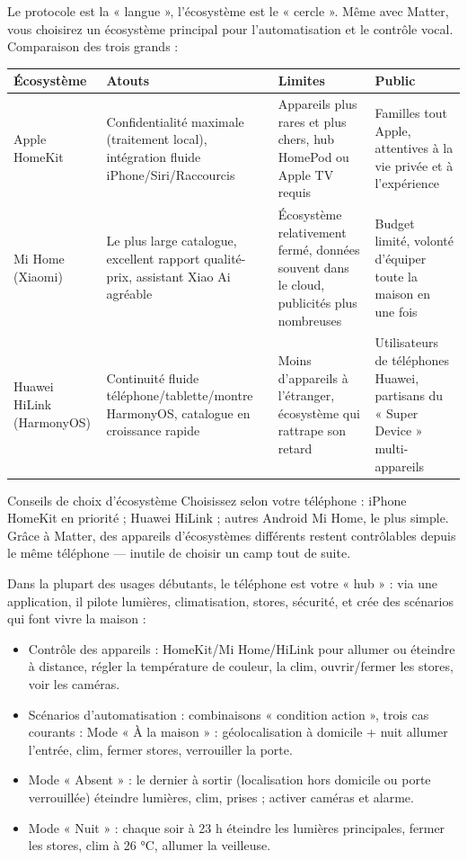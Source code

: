 
Le protocole est la « langue », l'écosystème est le « cercle ». Même avec Matter, vous choisirez un écosystème principal pour l'automatisation et le contrôle vocal. Comparaison des trois grands :

\begin{center}
\begin{tabularx}{\linewidth}{|X|X|X|X|}
\hline
\textbf{Écosystème} & \textbf{Atouts} & \textbf{Limites} & \textbf{Public} \tabularnewline
\hline
Apple HomeKit & Confidentialité maximale (traitement local), intégration fluide iPhone/Siri/Raccourcis & Appareils plus rares et plus chers, hub HomePod ou Apple TV requis & Familles tout Apple, attentives à la vie privée et à l'expérience \tabularnewline
Mi Home (Xiaomi) & Le plus large catalogue, excellent rapport qualité-prix, assistant Xiao Ai agréable & Écosystème relativement fermé, données souvent dans le cloud, publicités plus nombreuses & Budget limité, volonté d'équiper toute la maison en une fois \tabularnewline
Huawei HiLink (HarmonyOS) & Continuité fluide téléphone/tablette/montre HarmonyOS, catalogue en croissance rapide & Moins d'appareils à l'étranger, écosystème qui rattrape son retard & Utilisateurs de téléphones Huawei, partisans du « Super Device » multi-appareils \tabularnewline
\hline
\end{tabularx}
\end{center}

\begin{tcbinfo}{Conseils de choix d'écosystème}
Choisissez selon votre téléphone : iPhone HomeKit en priorité ; Huawei HiLink ; autres Android Mi Home, le plus simple. Grâce à Matter, des appareils d'écosystèmes différents restent contrôlables depuis le même téléphone — inutile de choisir un camp tout de suite.

\end{tcbinfo}


Dans la plupart des usages débutants, le téléphone est votre « hub » : via une application, il pilote lumières, climatisation, stores, sécurité, et crée des scénarios qui font vivre la maison :

\begin{itemize}
  \item Contrôle des appareils : HomeKit/Mi Home/HiLink pour allumer ou éteindre à distance, régler la température de couleur, la clim, ouvrir/fermer les stores, voir les caméras.
  \item Scénarios d'automatisation : combinaisons « condition action », trois cas courants : Mode « À la maison » : géolocalisation à domicile + nuit allumer l'entrée, clim, fermer stores, verrouiller la porte.
  \item Mode « Absent » : le dernier à sortir (localisation hors domicile ou porte verrouillée) éteindre lumières, clim, prises ; activer caméras et alarme.
  \item Mode « Nuit » : chaque soir à 23 h éteindre les lumières principales, fermer les stores, clim à 26 °C, allumer la veilleuse.
\end{itemize}

